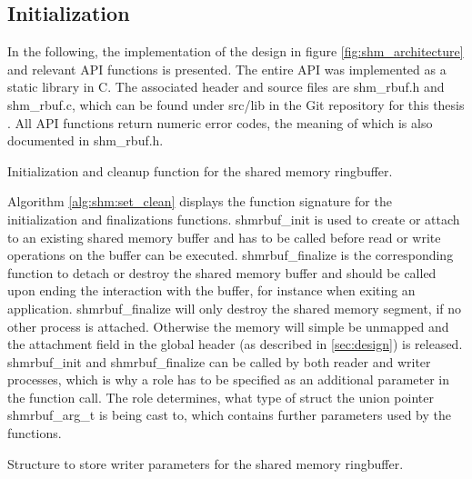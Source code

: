 \subsection{Initialization}
In the following, the implementation of the design in figure \ref{fig:shm_architecture} and relevant API functions is presented.
The entire API was implemented as a static library in C. The associated header and source files are shm\_rbuf.h and shm\_rbuf.c, which can be found 
under src/lib in the Git repository for this thesis \cite{gitlab}. All API functions return numeric error codes, the meaning of which is also documented in shm\_rbuf.h.  
\par
\begin{algorithm}[h!]
    
    \label{alg:shm:set_clean}
    \caption[Shared Memory Ringbuffer: Initialization and Cleanup]{Initialization and cleanup function for the shared memory ringbuffer.}
\end{algorithm}
Algorithm \ref{alg:shm:set_clean} displays the function signature for  the initialization and finalizations functions.
shmrbuf\_init is used to create or attach to an existing shared memory buffer and has to be called before read or write operations
on the buffer can be executed. shmrbuf\_finalize is the corresponding function to detach or destroy the shared memory buffer and should be called
upon ending the interaction with the buffer, for instance when exiting an application. shmrbuf\_finalize will only destroy the shared memory segment,
if no other process is attached. Otherwise the memory will simple be unmapped and the attachment field in the global header (as described in \ref{sec:design}) is released. 
shmrbuf\_init and shmrbuf\_finalize can be called by both reader and writer 
processes, which is why a role has to be specified as an additional parameter in the function call. The role determines, what type of struct the union pointer shmrbuf\_arg\_t is being cast to,
which contains further parameters used by the functions. 

\begin{algorithm}[h!]
    
    \label{alg:shm:writer_arg}
    \caption[Shared Memory Ringbuffer: Writer Parameters]{Structure to store writer parameters for the shared memory ringbuffer.}
\end{algorithm}


